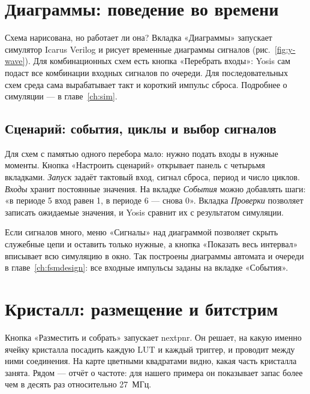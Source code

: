 
\section{Диаграммы: поведение во времени}

Схема нарисована, но работает ли она? Вкладка «Диаграммы» запускает
симулятор Icarus Verilog и рисует временные диаграммы сигналов
(рис.~\ref{fig:y-wave}). Для комбинационных схем есть кнопка «Перебрать
входы»: Yosis сам подаст все комбинации входных сигналов по очереди. Для
последовательных схем среда сама вырабатывает такт и короткий импульс сброса.
Подробнее о симуляции --- в главе~\ref{ch:sim}.


\subsection{Сценарий: события, циклы и выбор сигналов}

Для схем с памятью одного перебора мало: нужно подать входы в нужные
моменты. Кнопка «Настроить сценарий» открывает панель с четырьмя вкладками.
\emph{Запуск} задаёт тактовый вход, сигнал сброса, период и число циклов.
\emph{Входы} хранит постоянные значения. На вкладке \emph{События} можно
добавлять шаги: «в периоде 5 вход  равен 1, в периоде 6 --- снова 0».
Вкладка \emph{Проверки} позволяет записать ожидаемые значения, и Yosis
сравнит их с результатом симуляции.

Если сигналов много, меню «Сигналы» над диаграммой позволяет скрыть
служебные цепи и оставить только нужные, а кнопка «Показать весь интервал»
вписывает всю симуляцию в окно. Так построены диаграммы автомата и очереди
в главе~\ref{ch:fsmdesign}: все входные импульсы заданы на вкладке «События».

\section{Кристалл: размещение и битстрим}

Кнопка «Разместить и собрать» запускает nextpnr. Он решает, на какую именно
ячейку кристалла посадить каждую LUT и каждый триггер, и проводит между ними
соединения. На карте цветными квадратами видно, какая часть кристалла занята.
Рядом --- отчёт о частоте: для нашего примера он показывает запас более чем
в десять раз относительно 27~МГц.

